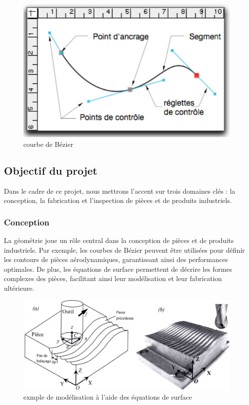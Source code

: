 \documentclass{article}
\begin{document}
\begin{figure}[h]
  \centering
  \includegraphics[width = 1\textwidth]{Bezier.png}
  \caption{courbe de Bézier}
  
\end{figure}




\subsection{Objectif du projet }
Dans le cadre de ce projet, nous mettrons l'accent sur trois domaines clés : la conception, la fabrication et l'inspection de pièces et de produits industriels.

\subsubsection{Conception}
La géométrie joue un rôle central dans la conception de pièces et de produits industriels. Par exemple, les courbes de Bézier peuvent être utilisées pour définir les contours de pièces aérodynamiques, garantissant ainsi des performances optimales. De plus, les équations de surface permettent de décrire les formes complexes des pièces, facilitant ainsi leur modélisation et leur fabrication ultérieure.

\begin{figure}[H]
  \centering
  \includegraphics[width =\textwidth]{modelisation.png}
  \caption{exmple de modélisation à l'aide des équations de surface}
  
\end{figure}
\end{document}
